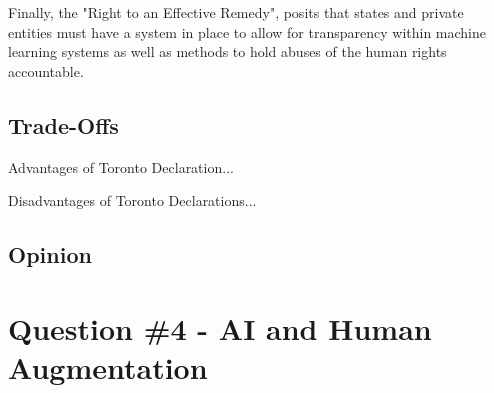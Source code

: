 \documentclass[
	letterpaper, %
]{jdf}
\begin{document}
Finally, the "Right to an Effective Remedy", posits that states and private entities must have a system in place to allow for transparency within machine learning systems as well as methods to hold abuses of the human rights accountable.
\subsection{Trade-Offs}
Advantages of Toronto Declaration...

Disadvantages of Toronto Declarations...
\subsection{Opinion}

\section{Question \#4 - AI and Human Augmentation}


\end{document}
